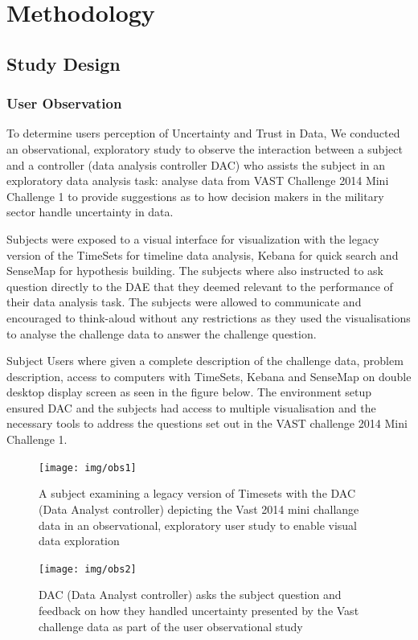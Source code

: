 \documentclass[journal]{vgtc}                %
\begin{document}
\section{Methodology}

\subsection{Study Design}
\subsubsection{User Observation}
To determine users perception of Uncertainty and Trust in Data, We conducted an observational, exploratory study to observe the interaction between a subject and a controller (data analysis controller DAC) who assists the subject in an exploratory data analysis task: analyse data from VAST Challenge 2014 Mini Challenge 1 to provide suggestions as to how decision makers in the military sector handle uncertainty in data.

Subjects were exposed to a visual interface for visualization with the legacy version of the TimeSets for timeline data analysis, Kebana for quick search and SenseMap for hypothesis building. The subjects where also instructed to ask question directly to the DAE that they deemed relevant to the performance of their data analysis task. The subjects were allowed to communicate and encouraged to think-aloud without any restrictions as they used the visualisations to analyse the challenge data to answer the challenge question.

Subject Users where given a complete description of the challenge data, problem description, access to computers with TimeSets, Kebana and SenseMap on double desktop display screen as seen in the figure below. The environment setup ensured DAC and the subjects had access to multiple visualisation and the necessary tools to address the questions set out in the VAST challenge 2014 Mini Challenge 1.

\begin{figure}[htb]
 \centering
 \texttt{[image: img/obs1]}
 \caption{A subject examining a legacy version of Timesets with the DAC (Data Analyst controller) depicting the Vast 2014 mini challange data in an observational, exploratory user study to enable visual data exploration}
\end{figure}

\begin{figure}[htb]
 \centering
 \texttt{[image: img/obs2]}
 \caption{DAC (Data Analyst controller) asks the subject question and feedback on how they handled uncertainty presented by the Vast challenge data as part of the user observational study }
\end{figure}
\end{document}
